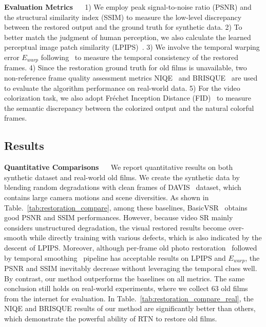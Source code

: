 \documentclass[10pt,twocolumn,letterpaper]{article}
\begin{document}
	\noindent\textbf{Evaluation Metrics} ~~ 1) We employ peak signal-to-noise ratio (PSNR) and the structural similarity index (SSIM) to measure the low-level discrepancy between the restored output and the ground truth for synthetic data. 2) To better match the judgment of human perception, we also calculate the learned perceptual image patch similarity (LPIPS)~\cite{zhang2018perceptual}. 3) 
	We involve the temporal warping error $E_{warp}$ following~\cite{chen2017coherent,lai2018learning} to measure the temporal consistency of the restored frames. 4) Since the restoration ground truth for old films is unavailable, two non-reference frame quality assessment metrics NIQE~\cite{NIQE} and BRISQUE~\cite{BRISQUE} are used to evaluate the algorithm performance on real-world data. 5) For the video colorization task, we also adopt Fr\'echet Inception Distance (FID)~\cite{FID} to measure the semantic discrepancy between the colorized output and the natural colorful frames. 


	
	
	
	
	\subsection{Results}
	\noindent\textbf{Quantitative Comparisons} ~~ We report quantitative results on both synthetic dataset and real-world old films. We create the synthetic data by blending random degradations with clean frames of DAVIS~\cite{pont20172017} dataset, which contains large camera motions and scene diversities. As shown in Table.~\ref{tab:restoration_compare}, among these baselines, BasicVSR~\cite{chan2021basicvsr} obtains good PSNR and SSIM performances. However, because video 
	SR mainly considers unstructured degradation, the visual restored results become over-smooth while directly training with various defects, which is also indicated by the descent of LPIPS. Moreover, although per-frame old photo restoration~\cite{wan2020bringing} followed by temporal smoothing~\cite{lai2018learning} pipeline has acceptable results on LPIPS and $E_{warp}$, the PSNR and SSIM inevitably decrease without leveraging the temporal clues well. By contrast, our method outperforms the baselines on all metrics. The same conclusion still holds on real-world experiments, where we collect 63 old films from the internet for evaluation. In Table.~\ref{tab:restoration_compare_real}, the NIQE and BRISQUE results of our method are significantly better than others, which demonstrate the powerful ability of RTN to restore old films.
	
\end{document}
